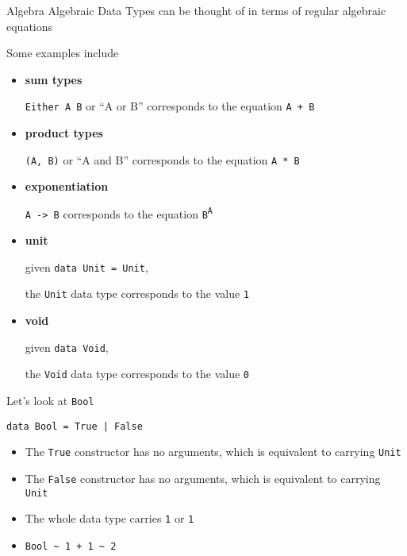 \begin{frame}
\begin{block}{Algebra}
Algebraic Data Types can be thought of in terms of regular algebraic equations
\end{block}
\end{frame}

\begin{frame}
\begin{block}{Some examples include}
\begin{itemize}
  \item \textbf{sum types}

        \lstinline{Either A B} or ``A or B'' corresponds to the equation \lstinline{A + B}
  \item \textbf{product types}

        \lstinline{(A, B)} or ``A and B'' corresponds to the equation \lstinline{A * B}
  \item \textbf{exponentiation}

        \lstinline{A -> B} corresponds to the equation \lstinline{B}\textsuperscript{\lstinline{A}}
  \item \textbf{unit}

        given \lstinline{data Unit = Unit},

        the \lstinline{Unit} data type corresponds to the value \lstinline{1}
  \item \textbf{void}

        given \lstinline{data Void},

        the \lstinline{Void} data type corresponds to the value \lstinline{0}
\end{itemize}
\end{block}
\end{frame}

\begin{frame}[fragile]
\begin{block}{Let's look at \lstinline{Bool}}
\begin{lstlisting}
data Bool = True | False
\end{lstlisting}
\begin{itemize}
  \item<1-> The \lstinline{True} constructor has no arguments, which is equivalent to carrying \lstinline{Unit}
  \item<1-> The \lstinline{False} constructor has no arguments, which is equivalent to carrying \lstinline{Unit}
  \item<2-> The whole data type carries \lstinline{1} or \lstinline{1}
  \item<2-> \lstinline{Bool ~ 1 + 1 ~ 2}
\end{itemize}
\end{block}
\end{frame}

